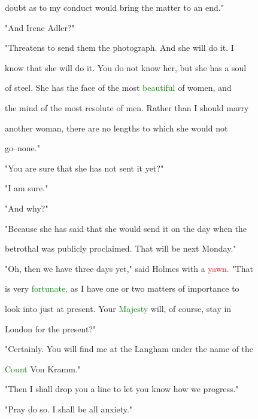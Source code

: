  \textcolor{BurntOrange}{doubt} as to my conduct would bring the matter to an end."



 "And Irene Adler?"



 "Threatens to send them the photograph. And she will do it. I

 know that she will do it. You do not know her, but she has a soul

 of steel. She has the face of the most \textcolor{green}{beautiful} of women, and

 the mind of the most resolute of men. Rather than I should \textcolor{BurntOrange}{marry}

 another woman, there are no lengths to which she would not

 go--none."



 "You are sure that she has not sent it yet?"



 "I am sure."



 "And why?"



 "Because she has said that she would send it on the day when the

 betrothal was publicly proclaimed. That will be next Monday."



 "Oh, then we have three days yet," said Holmes with a \textcolor{red}{yawn.} "That

 is very \textcolor{green}{fortunate,} as I have one or two matters of \textcolor{BurntOrange}{importance} to

 look into just at \textcolor{BurntOrange}{present.} Your \textcolor{green}{Majesty} will, of course, stay in

 London for the \textcolor{BurntOrange}{present?"}



 "Certainly. You will find me at the Langham under the name of the

 \textcolor{green}{Count} Von Kramm."



 "Then I shall drop you a line to let you know how we \textcolor{BurntOrange}{progress."}



 \textcolor{BurntOrange}{"Pray} do so. I shall be all \textcolor{BurntOrange}{anxiety."}



